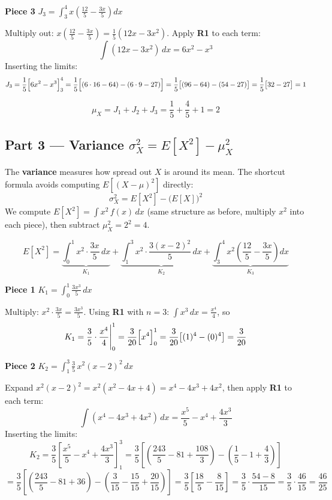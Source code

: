\documentclass[12pt, a4paper]{article}
\begin{document}
\medskip
\textbf{Piece 3} \quad $J_3 = \displaystyle\int_3^4 x\!\left(\frac{12}{5}-\frac{3x}{5}\right)dx$

Multiply out: $x\!\left(\tfrac{12}{5}-\tfrac{3x}{5}\right) = \tfrac{1}{5}(12x-3x^2)$.
Apply \textbf{R1} to each term:
\[
  \int(12x-3x^2)\,dx = 6x^2-x^3
\]
Inserting the limits:
\[
  J_3 = \frac{1}{5}\Bigl[6x^2-x^3\Bigr]_3^4
      = \frac{1}{5}\Bigl[(6\cdot16-64)-(6\cdot9-27)\Bigr]
      = \frac{1}{5}\bigl[(96-64)-(54-27)\bigr]
      = \frac{1}{5}\bigl[32-27\bigr]
      = 1
\]

\[
  \boxed{\mu_X = J_1+J_2+J_3 = \frac{1}{5}+\frac{4}{5}+1 = 2}
\]

\subsection*{Part 3 --- Variance $\sigma_X^2 = E[X^2] - \mu_X^2$}

\begin{notebox}
The \textbf{variance} measures how spread out $X$ is around its mean.
The shortcut formula avoids computing $E[(X-\mu)^2]$ directly:
\[
  \sigma_X^2 = E[X^2] - \bigl(E[X]\bigr)^2
\]
We compute $E[X^2] = \int x^2\,f(x)\,dx$ (same structure as before, multiply $x^2$ into each piece),
then subtract $\mu_X^2 = 2^2 = 4$.
\end{notebox}

\[
  E[X^2] = \underbrace{\int_0^1 x^2\cdot\frac{3x}{5}\,dx}_{K_1}
          + \underbrace{\int_1^3 x^2\cdot\frac{3(x-2)^2}{5}\,dx}_{K_2}
          + \underbrace{\int_3^4 x^2\!\left(\frac{12}{5}-\frac{3x}{5}\right)dx}_{K_3}
\]

\medskip
\textbf{Piece 1} \quad $K_1 = \displaystyle\int_0^1 \frac{3x^3}{5}\,dx$

Multiply: $x^2\cdot\tfrac{3x}{5} = \tfrac{3x^3}{5}$.
Using \textbf{R1} with $n=3$: $\displaystyle\int x^3\,dx = \frac{x^4}{4}$, so
\[
  K_1 = \frac{3}{5}\cdot\frac{x^4}{4}\Bigg|_0^1
      = \frac{3}{20}\Bigl[x^4\Bigr]_0^1
      = \frac{3}{20}\bigl[(1)^4-(0)^4\bigr]
      = \frac{3}{20}
\]

\medskip
\textbf{Piece 2} \quad $K_2 = \displaystyle\int_1^3 \frac{3}{5}\,x^2(x-2)^2\,dx$

Expand $x^2(x-2)^2 = x^2(x^2-4x+4) = x^4-4x^3+4x^2$, then apply \textbf{R1} to each term:
\[
  \int(x^4-4x^3+4x^2)\,dx = \frac{x^5}{5} - x^4 + \frac{4x^3}{3}
\]
Inserting the limits:
\[
  K_2 = \frac{3}{5}\left[\frac{x^5}{5}-x^4+\frac{4x^3}{3}\right]_1^3
      = \frac{3}{5}\left[
          \left(\frac{243}{5}-81+\frac{108}{3}\right)
        - \left(\frac{1}{5}-1+\frac{4}{3}\right)
        \right]
\]
\[
      = \frac{3}{5}\left[
          \left(\frac{243}{5}-81+36\right)
        - \left(\frac{3}{15}-\frac{15}{15}+\frac{20}{15}\right)
        \right]
      = \frac{3}{5}\left[\frac{18}{5}-\frac{8}{15}\right]
      = \frac{3}{5}\cdot\frac{54-8}{15}
      = \frac{3}{5}\cdot\frac{46}{15}
      = \frac{46}{25}
\]
\end{document}
